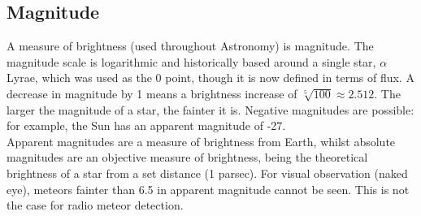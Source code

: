 \subsection{Magnitude}
A measure of brightness (used throughout Astronomy) is magnitude. The magnitude scale is logarithmic and historically based around a single star, $\alpha$ Lyrae, which was used as the 0 point, though it is now defined in terms of flux. A decrease in magnitude by 1 means a brightness increase of $\sqrt[5]{100} \approx 2.512$. The larger the magnitude of a star, the fainter it is. Negative magnitudes are possible: for example, the Sun has an apparent magnitude of -27.\\
Apparent magnitudes are a measure of brightness from Earth, whilst absolute magnitudes are an objective measure of brightness, being the theoretical brightness of a star from a set distance (1 parsec). For visual observation (naked eye), meteors fainter than 6.5 in apparent magnitude cannot be seen. This is not the case for radio meteor detection.